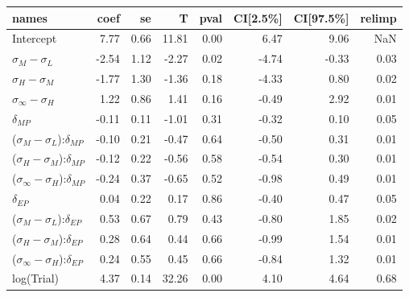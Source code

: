 

\begin{tabular}{lrrrrrrr}
\toprule
                                         names &  coef &   se &     T &  pval &  CI[2.5\%] &  CI[97.5\%] &  relimp \\
\midrule
                                     Intercept &  7.77 & 0.66 & 11.81 &  0.00 &       6.47 &        9.06 &     NaN \\
                     $\sigma_{M} - \sigma_{L}$ & -2.54 & 1.12 & -2.27 &  0.02 &      -4.74 &       -0.33 &    0.03 \\
                     $\sigma_{H} - \sigma_{M}$ & -1.77 & 1.30 & -1.36 &  0.18 &      -4.33 &        0.80 &    0.02 \\
                $\sigma_{\infty} - \sigma_{H}$ &  1.22 & 0.86 &  1.41 &  0.16 &      -0.49 &        2.92 &    0.01 \\
                                 $\delta_{MP}$ & -0.11 & 0.11 & -1.01 &  0.31 &      -0.32 &        0.10 &    0.05 \\
     ($\sigma_{M} - \sigma_{L}$):$\delta_{MP}$ & -0.10 & 0.21 & -0.47 &  0.64 &      -0.50 &        0.31 &    0.01 \\
     ($\sigma_{H} - \sigma_{M}$):$\delta_{MP}$ & -0.12 & 0.22 & -0.56 &  0.58 &      -0.54 &        0.30 &    0.01 \\
($\sigma_{\infty} - \sigma_{H}$):$\delta_{MP}$ & -0.24 & 0.37 & -0.65 &  0.52 &      -0.98 &        0.49 &    0.01 \\
                                 $\delta_{EP}$ &  0.04 & 0.22 &  0.17 &  0.86 &      -0.40 &        0.47 &    0.05 \\
     ($\sigma_{M} - \sigma_{L}$):$\delta_{EP}$ &  0.53 & 0.67 &  0.79 &  0.43 &      -0.80 &        1.85 &    0.02 \\
     ($\sigma_{H} - \sigma_{M}$):$\delta_{EP}$ &  0.28 & 0.64 &  0.44 &  0.66 &      -0.99 &        1.54 &    0.01 \\
($\sigma_{\infty} - \sigma_{H}$):$\delta_{EP}$ &  0.24 & 0.55 &  0.45 &  0.66 &      -0.84 &        1.32 &    0.01 \\
                                    log(Trial) &  4.37 & 0.14 & 32.26 &  0.00 &       4.10 &        4.64 &    0.68 \\
\bottomrule
\end{tabular}


